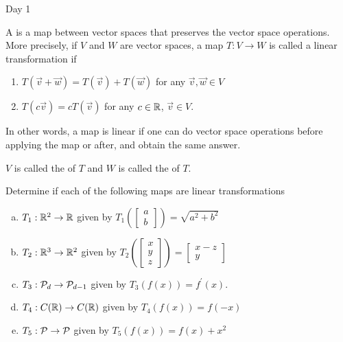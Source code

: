 \documentclass{article}[12pt]
\begin{document}
\begin{applicationActivities}{Day 1}

\begin{definition}
A  is a map between vector spaces that preserves the vector space operations.  More precisely, if $V$ and $W$ are vector spaces, a map $T:V\rightarrow W$ is called a linear transformation if
\begin{enumerate}
\item $T(\vec{v}+\vec{w}) = T(\vec{v})+T(\vec{w})$ for any $\vec{v},\vec{w} \in V$
\item $T(c\vec{v}) = cT(\vec{v})$ for any $c \in \IR$, $\vec{v} \in V$.
\end{enumerate}
In other words, a map is linear if one can do vector space operations before applying the map or after, and obtain the same answer.

$V$ is called the  of $T$ and $W$ is called the  of $T$.
\end{definition}

\begin{activity}
Determine if each of the following maps are linear transformations
\begin{enumerate}[(a)]
\item $T_1 : \IR^2 \rightarrow \IR$ given by $T_1\left(\begin{bmatrix} a \\ b \end{bmatrix} \right) = \sqrt{a^2+b^2}$
\item $T_2 : \IR^3 \rightarrow \IR^2$ given by $T_2\left(\begin{bmatrix} x \\ y \\ z \end{bmatrix} \right) = \begin{bmatrix} x-z \\ y \end{bmatrix}$
\item $T_3: \P_d \rightarrow \P_{d-1}$ given by $T_3(f(x)) = f^\prime(x)$.
\item $T_4: C(\IR) \rightarrow C(\IR)$ given by $T_4(f(x)) = f(-x)$
\item $T_5: \P \rightarrow \P$ given by $T_5(f(x)) = f(x)+x^2$
\end{enumerate}
\end{activity}


\end{applicationActivities}
\end{document}
